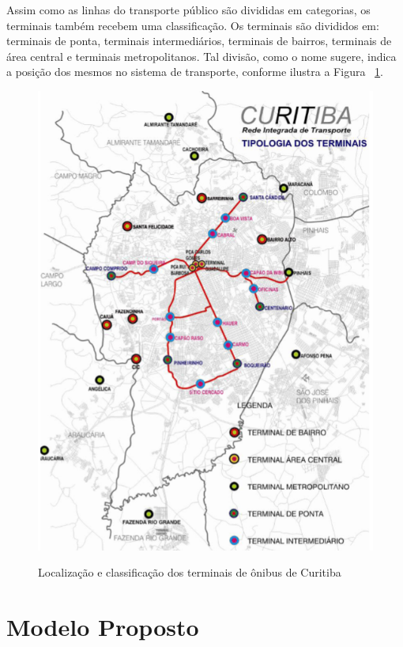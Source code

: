 \textcolor{clauciane}{
Assim como as linhas do transporte público são divididas em categorias, os terminais também recebem uma classificação. Os terminais  são divididos em: terminais de ponta, terminais intermediários, terminais de bairros, terminais de área central e terminais metropolitanos. Tal divisão, como o nome sugere, indica a posição dos mesmos no sistema de transporte, conforme ilustra a Figura ~\ref{fig:terminais}.
 \begin{figure}[!h]
 \caption{Localização e classificação dos terminais de ônibus de Curitiba}
     \centering
     \includegraphics[scale=.95]{./Capitulo3/img/terminais.png}
         \label{fig:terminais}
 \end{figure}
}

\section{Modelo Proposto} \label{sec:met}

